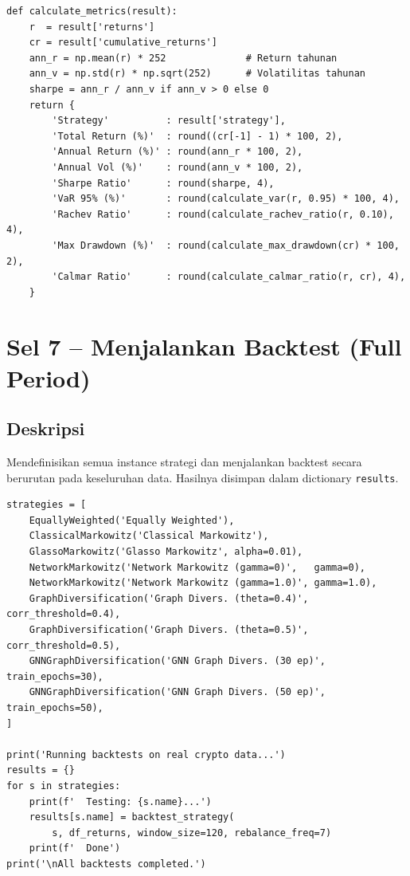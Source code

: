 \documentclass[12pt,a4paper]{article}
\begin{document}
\begin{lstlisting}[caption={\texttt{calculate\_metrics}}]
def calculate_metrics(result):
    r  = result['returns']
    cr = result['cumulative_returns']
    ann_r = np.mean(r) * 252              # Return tahunan
    ann_v = np.std(r) * np.sqrt(252)      # Volatilitas tahunan
    sharpe = ann_r / ann_v if ann_v > 0 else 0
    return {
        'Strategy'          : result['strategy'],
        'Total Return (%)'  : round((cr[-1] - 1) * 100, 2),
        'Annual Return (%)' : round(ann_r * 100, 2),
        'Annual Vol (%)'    : round(ann_v * 100, 2),
        'Sharpe Ratio'      : round(sharpe, 4),
        'VaR 95% (%)'       : round(calculate_var(r, 0.95) * 100, 4),
        'Rachev Ratio'      : round(calculate_rachev_ratio(r, 0.10), 4),
        'Max Drawdown (%)'  : round(calculate_max_drawdown(cr) * 100, 2),
        'Calmar Ratio'      : round(calculate_calmar_ratio(r, cr), 4),
    }
\end{lstlisting}

\section{Sel 7 -- Menjalankan Backtest (Full Period)}

\subsection{Deskripsi}
Mendefinisikan semua instance strategi dan menjalankan backtest secara berurutan
pada keseluruhan data. Hasilnya disimpan dalam dictionary \texttt{results}.

\begin{lstlisting}[caption={Menjalankan backtest untuk semua strategi}]
strategies = [
    EquallyWeighted('Equally Weighted'),
    ClassicalMarkowitz('Classical Markowitz'),
    GlassoMarkowitz('Glasso Markowitz', alpha=0.01),
    NetworkMarkowitz('Network Markowitz (gamma=0)',   gamma=0),
    NetworkMarkowitz('Network Markowitz (gamma=1.0)', gamma=1.0),
    GraphDiversification('Graph Divers. (theta=0.4)', corr_threshold=0.4),
    GraphDiversification('Graph Divers. (theta=0.5)', corr_threshold=0.5),
    GNNGraphDiversification('GNN Graph Divers. (30 ep)', train_epochs=30),
    GNNGraphDiversification('GNN Graph Divers. (50 ep)', train_epochs=50),
]

print('Running backtests on real crypto data...')
results = {}
for s in strategies:
    print(f'  Testing: {s.name}...')
    results[s.name] = backtest_strategy(
        s, df_returns, window_size=120, rebalance_freq=7)
    print(f'  Done')
print('\nAll backtests completed.')
\end{lstlisting}
\end{document}
